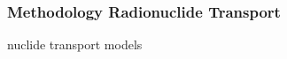 \begin{frame}
  \frametitle{Methodology Radionuclide Transport}
  nuclide transport models
\end{frame}
